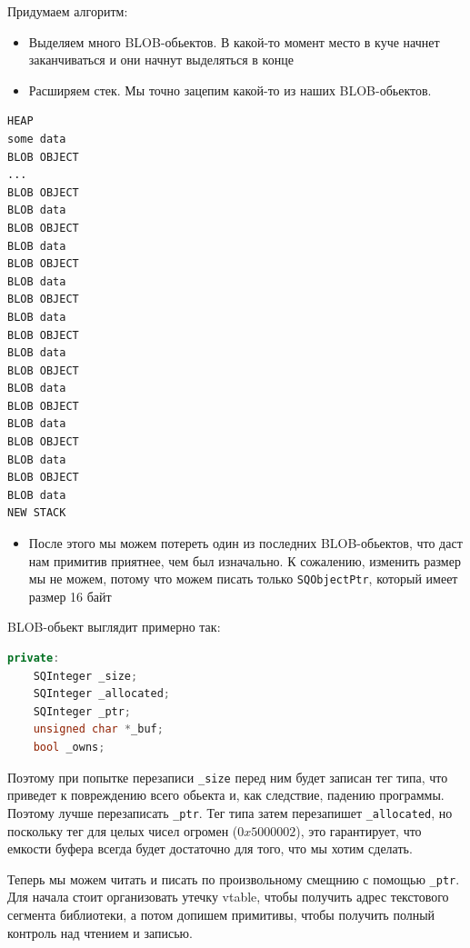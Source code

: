 \documentclass[idxtotoc,hyperref,openany,oneside]{files/pwn} %
\begin{document}
Придумаем алгоритм:
\begin{itemize}
\item Выделяем много BLOB-обьектов. В какой-то момент место в куче начнет заканчиваться и они начнут выделяться в конце
\item Расширяем стек. Мы точно зацепим какой-то из наших BLOB-обьектов.
\end{itemize}
\begin{lstlisting}
HEAP
some data
BLOB OBJECT
...
BLOB OBJECT
BLOB data
BLOB OBJECT
BLOB data
BLOB OBJECT
BLOB data
BLOB OBJECT
BLOB data
BLOB OBJECT
BLOB data
BLOB OBJECT
BLOB data
BLOB OBJECT
BLOB data
BLOB OBJECT
BLOB data
BLOB OBJECT
BLOB data
NEW STACK
\end{lstlisting}
\begin{itemize}
\item После этого мы можем потереть один из последних BLOB-обьектов, что даст нам примитив приятнее, чем был изначально. К сожалению, изменить размер мы не можем, потому что можем писать только \verb|SQObjectPtr|, который имеет размер 16 байт
\end{itemize}
BLOB-обьект выглядит примерно так:
\begin{lstlisting}[language=C++,
                   directivestyle={\color{black}}
                   emph={int,char,double,float,unsigned},
                   emphstyle={\color{blue}}
                  ]
private:
    SQInteger _size;
    SQInteger _allocated;
    SQInteger _ptr;
    unsigned char *_buf;
    bool _owns;
\end{lstlisting}
Поэтому при попытке перезаписи \verb|_size| перед ним будет записан тег типа, что приведет к повреждению всего обьекта и, как следствие, падению программы. Поэтому лучше перезаписать \verb|_ptr|. Тег типа затем перезапишет \verb|_allocated|, но поскольку тег для целых чисел огромен ($0x5000002$), это гарантирует, что емкости буфера всегда будет достаточно для того, что мы хотим сделать.

Теперь мы можем читать и писать по произвольному смещнию с помощью \verb|_ptr|. Для начала стоит организовать утечку vtable, чтобы получить адрес текстового сегмента библиотеки, а потом допишем примитивы, чтобы получить полный контроль над чтением и записью. 
\end{document}
